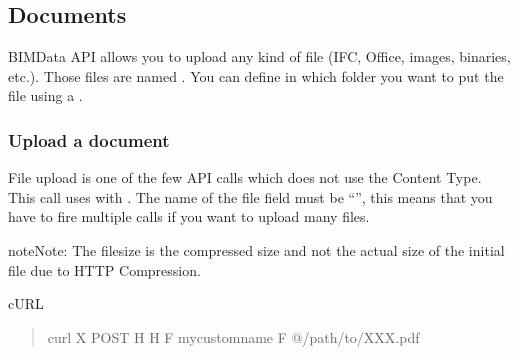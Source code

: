 \documentclass[a4paper,12pt,english]{sphinxmanual}
\begin{document}
\subsection{Documents}
\label{\detokenize{concepts/folders_and_documents:documents}}
BIMData API allows you to upload any kind of file (IFC, Office, images, binaries, etc.). Those files are named .
You can define in which folder you want to put the file using a .


\subsubsection{Upload a document}
\label{\detokenize{concepts/folders_and_documents:upload-a-document}}
File upload is one of the few API calls which does not use the  Content Type. This call uses  with .
The name of the file field must be “”, this means that you have to fire multiple calls if you want to upload many files.

\begin{sphinxadmonition}{note}{Note:}
The filesize is the compressed size and not the actual size of the initial file due to HTTP Compression.
\end{sphinxadmonition}

cURL
\begin{quote}

%
\begin{sphinxVerbatim}[commandchars=\\\{\}]
curl \PYGZhy{}X POST 
 
\PYGZhy{}H 
\PYGZhy{}H  
\PYGZhy{}F my\PYGZus{}custom\PYGZus{}name 
\PYGZhy{}F @/path/to/XXX.pdf
\end{sphinxVerbatim}
\end{quote}
\end{document}
